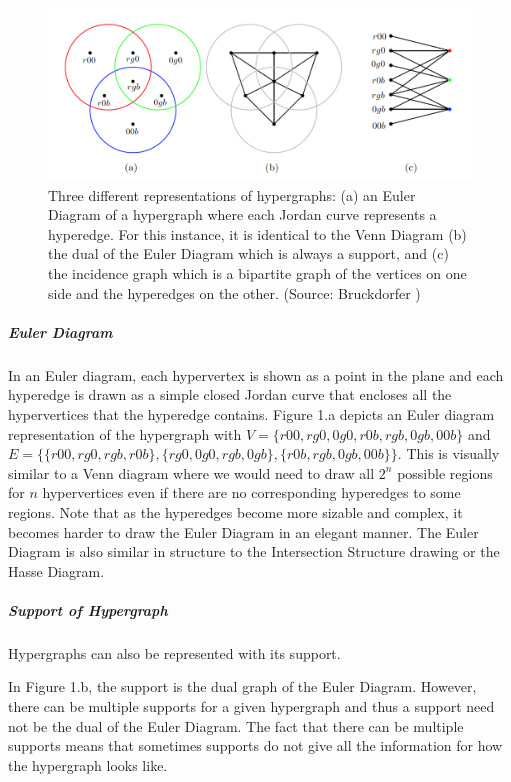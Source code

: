 \documentclass{NSF}
\begin{document}
\begin{figure}[ht]
\centering
\includegraphics[width=\textwidth]{diagram1}
\caption{Three different representations of hypergraphs: (a) an Euler Diagram of a hypergraph where each Jordan curve represents a hyperedge. For this instance, it is identical to the Venn Diagram (b) the dual of the Euler Diagram which is always a support, and (c) the incidence graph which is a bipartite graph of the vertices on one side and the hyperedges on the other. (Source: Bruckdorfer \cite{tubingen2016})}
\end{figure}

\subparagraph{Euler Diagram}
In an Euler diagram, each hypervertex is shown as a point in the plane and each hyperedge is drawn as a simple closed Jordan curve that encloses all the hypervertices that the hyperedge contains. Figure 1.a depicts an Euler diagram representation of the hypergraph with $V = \{r00, rg0, 0g0, r0b, rgb, 0gb, 00b\}$ and $E = \{  \{r00,rg0,rgb,r0b\}, \{rg0,0g0,rgb,0gb\}, \{r0b,rgb,0gb,00b\}  \}$. This is visually similar to a Venn diagram where we would need to draw all $2^n$ possible regions for $n$ hypervertices even if there are no corresponding hyperedges to some regions. Note that as the hyperedges become more sizable and complex, it becomes harder to draw the Euler Diagram in an elegant manner. The Euler Diagram is also similar in structure to the Intersection Structure drawing or the Hasse Diagram.

\subparagraph{Support of Hypergraph}
Hypergraphs can also be represented with its support.

In Figure 1.b, the support is the dual graph of the Euler Diagram. However, there can be multiple supports for a given hypergraph and thus a support need not be the dual of the Euler Diagram. 
The fact that there can be multiple supports means that sometimes supports do not give all the information for how the hypergraph looks like.
\end{document}
